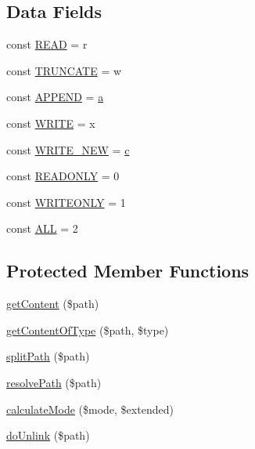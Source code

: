 \subsection*{Data Fields}
\begin{DoxyCompactItemize}
\item 
const \mbox{\hyperlink{classorg_1_1bovigo_1_1vfs_1_1vfs_stream_wrapper_add302975378da047de904daa059a332b}{R\+E\+AD}} = \textquotesingle{}r\textquotesingle{}
\item 
const \mbox{\hyperlink{classorg_1_1bovigo_1_1vfs_1_1vfs_stream_wrapper_aa10d31f8aa25c6075dd7552faf588aca}{T\+R\+U\+N\+C\+A\+TE}} = \textquotesingle{}w\textquotesingle{}
\item 
const \mbox{\hyperlink{classorg_1_1bovigo_1_1vfs_1_1vfs_stream_wrapper_a3c20641fcacc78eafc28f1494c4ccd7b}{A\+P\+P\+E\+ND}} = \textquotesingle{}\mbox{\hyperlink{interfacea}{a}}\textquotesingle{}
\item 
const \mbox{\hyperlink{classorg_1_1bovigo_1_1vfs_1_1vfs_stream_wrapper_aaedf1c3375abd8a1f5404863a1c57e07}{W\+R\+I\+TE}} = \textquotesingle{}x\textquotesingle{}
\item 
const \mbox{\hyperlink{classorg_1_1bovigo_1_1vfs_1_1vfs_stream_wrapper_a31937e82312653951b2dbc5a7a1af935}{W\+R\+I\+T\+E\+\_\+\+N\+EW}} = \textquotesingle{}\mbox{\hyperlink{classc}{c}}\textquotesingle{}
\item 
const \mbox{\hyperlink{classorg_1_1bovigo_1_1vfs_1_1vfs_stream_wrapper_ad95b740fb6c86a1159e6bb96f4d1fdd1}{R\+E\+A\+D\+O\+N\+LY}} = 0
\item 
const \mbox{\hyperlink{classorg_1_1bovigo_1_1vfs_1_1vfs_stream_wrapper_a8e124a988c89f3102c7da35a9b9c59c8}{W\+R\+I\+T\+E\+O\+N\+LY}} = 1
\item 
const \mbox{\hyperlink{classorg_1_1bovigo_1_1vfs_1_1vfs_stream_wrapper_ab56e734000051e5c12c8c5cf6d8d160d}{A\+LL}} = 2
\end{DoxyCompactItemize}
\subsection*{Protected Member Functions}
\begin{DoxyCompactItemize}
\item 
\mbox{\hyperlink{classorg_1_1bovigo_1_1vfs_1_1vfs_stream_wrapper_a7d51cc891bac86ce9903945f5a144af9}{get\+Content}} (\$path)
\item 
\mbox{\hyperlink{classorg_1_1bovigo_1_1vfs_1_1vfs_stream_wrapper_a2d6d4d348e861b444db7ffdff5976442}{get\+Content\+Of\+Type}} (\$path, \$type)
\item 
\mbox{\hyperlink{classorg_1_1bovigo_1_1vfs_1_1vfs_stream_wrapper_a9ccf585d937023486b26731ad1849a6f}{split\+Path}} (\$path)
\item 
\mbox{\hyperlink{classorg_1_1bovigo_1_1vfs_1_1vfs_stream_wrapper_a71ebdd4c4f8fcf0282a6b88b30d466ce}{resolve\+Path}} (\$path)
\item 
\mbox{\hyperlink{classorg_1_1bovigo_1_1vfs_1_1vfs_stream_wrapper_ad3053de108475dc3073642dbfa5634d5}{calculate\+Mode}} (\$mode, \$extended)
\item 
\mbox{\hyperlink{classorg_1_1bovigo_1_1vfs_1_1vfs_stream_wrapper_af15d3d2fe557ff29fa9650ffee56892b}{do\+Unlink}} (\$path)
\end{DoxyCompactItemize}
